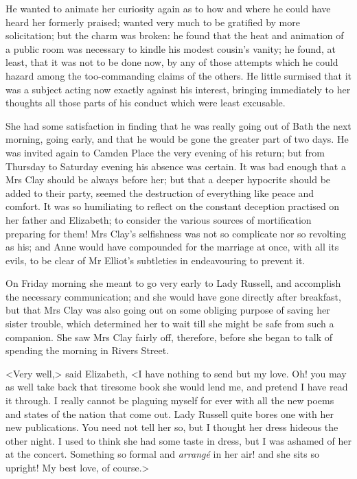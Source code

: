 He wanted to animate her curiosity again as to how and where he could have heard her formerly praised; wanted very much to be gratified by more solicitation; but the charm was broken: he found that the heat and animation of a public room was necessary to kindle his modest cousin's vanity; he found, at least, that it was not to be done now, by any of those attempts which he could hazard among the too-commanding claims of the others. He little surmised that it was a subject acting now exactly against his interest, bringing immediately to her thoughts all those parts of his conduct which were least excusable.

She had some satisfaction in finding that he was really going out of Bath the next morning, going early, and that he would be gone the greater part of two days. He was invited again to Camden Place the very evening of his return; but from Thursday to Saturday evening his absence was certain. It was bad enough that a Mrs Clay should be always before her; but that a deeper hypocrite should be added to their party, seemed the destruction of everything like peace and comfort. It was so humiliating to reflect on the constant deception practised on her father and Elizabeth; to consider the various sources of mortification preparing for them! Mrs Clay's selfishness was not so complicate nor so revolting as his; and Anne would have compounded for the marriage at once, with all its evils, to be clear of Mr Elliot's subtleties in endeavouring to prevent it.

On Friday morning she meant to go very early to Lady Russell, and accomplish the necessary communication; and she would have gone directly after breakfast, but that Mrs Clay was also going out on some obliging purpose of saving her sister trouble, which determined her to wait till she might be safe from such a companion. She saw Mrs Clay fairly off, therefore, before she began to talk of spending the morning in Rivers Street.

<Very well,> said Elizabeth, <I have nothing to send but my love. Oh! you may as well take back that tiresome book she would lend me, and pretend I have read it through. I really cannot be plaguing myself for ever with all the new poems and states of the nation that come out. Lady Russell quite bores one with her new publications. You need not tell her so, but I thought her dress hideous the other night. I used to think she had some taste in dress, but I was ashamed of her at the concert. Something so formal and \textit{arrangé} in her air! and she sits so upright! My best love, of course.>

